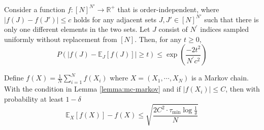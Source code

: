 \begin{lemma}\label{lemma:mc-data-dependent}
	Consider a function $f:[N]^{N'}\rightarrow \mathbb{R}^{+}$ that is order-independent, where $|f(J) - f(J')| \leq c$ holds for any adjacent sets $J, J' \in [N]^{N'}$ such that there is only one different elements in the two sets. Let $J$ consist of $N^\prime$ indices sampled uniformly without replacement from $[N]$. Then, for any $t \geq 0$,
	$$
	P\left(\left|f(J)-\mathbb{E}_J[f(J)]\right|\geq t\right) \leq \exp\left(\frac{-2t^2}{N^{\prime}c^2}\right)
	$$
\end{lemma}

\begin{proposition}\label{prop1: chernoff}
	Define $f(X)=\frac{1}{N}\sum_{i=1}^N f(X_i)$ where $X=(X_1, \cdots, X_N)$ is a Markov chain. With the condition in Lemma \ref{lemma:mc-markov} and if $|f(X_i)| \leq C$, then with probability at least $1-\delta$
	$$
	\mathbb{E}_X[f(X)] -f(X) \leq \sqrt{\frac{2C^2 \cdot \tau_{\min} \log \frac{1}{\delta}}{N}}
	$$
\end{proposition}

